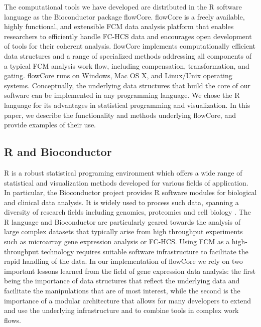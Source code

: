\documentclass[12pt]{article}
\newcommand{\Rpackage}[1]{{\textsf{#1}}}
\begin{document}
The computational tools we have developed are distributed in the R
software language as the Bioconductor package
\Rpackage{flowCore}. \Rpackage{flowCore} is a freely available, highly
functional, and extensible FCM data analysis platform that enables
researchers to efficiently handle FC-HCS data and encourages open
development of tools for their coherent analysis. \Rpackage{flowCore}
implements computationally efficient data structures and a range of
specialized methods addressing all components of a typical FCM
analysis work flow, including compensation, transformation, and
gating. \Rpackage{flowCore} runs on Windows, Mac OS X, and Linux/Unix
operating systems. Conceptually, the underlying data structures that
build the core of our software can be implemented in any programming
language. We chose the R language for its advantages in statistical
programming and visualization. In this paper, we describe the
functionality and methods underlying \Rpackage{flowCore}, and provide
examples of their use.

\subsection*{R and Bioconductor}
R is a robust statistical programing environment which offers a wide
range of statistical and visualization methods developed for various
fields of application. In particular, the Bioconductor project
provides R software modules for biological and clinical data analysis.
It is widely used to process such data, spanning a diversity of
research fields including genomics, proteomics and cell biology
\citep{BIOC}. The R language and Bioconductor are particularly geared
towards the analysis of large complex datasets that typically arise
from high throughput experiments such as microarray gene expression
analysis or FC-HCS. Using FCM as a high-throughput technology requires
suitable software infrastructure to facilitate the rapid handling of
the data. In our implementation of \Rpackage{flowCore} we rely on two
important lessons learned from the field of gene expression data
analysis: the first being the importance of data structures that
reflect the underlying data and facilitate the manipulations that are
of most interest, while the second is the importance of a modular
architecture that allows for many developers to extend and use the
underlying infrastructure and to combine tools in complex work flows.
\end{document}
